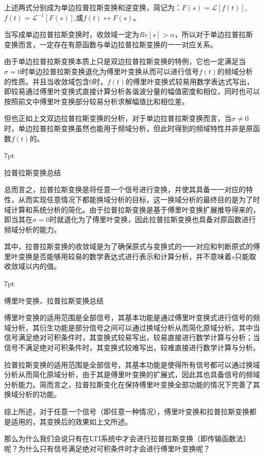\documentclass{article}
\numberwithin{equation}{section}
\numberwithin{figure}{section}
\newenvironment{formal}{%
\def\FrameCommand{%
\hspace{1pt}%
{\color{DarkBlue}\vrule width 2pt}%
{\color{formalshade}\vrule width 4pt}%
\colorbox{formalshade}%
}%
\MakeFramed{\advance\hsize-\width\FrameRestore}%
\noindent\hspace{-4.55pt}%
\begin{adjustwidth}{}{7pt}%
\vspace{2pt}\vspace{2pt}%
}
{%
\vspace{2pt}\end{adjustwidth}\endMakeFramed%
}
\begin{document}
上述两式分别成为单边拉普拉斯变换和逆变换，简记为：$F(s)=\mathscr{L}[f(t)]$,$f(t)=\mathscr{L}^{-1}[F(s)]$,或$f(t)\leftrightarrow F(s)$。

当写成单边拉普拉斯变换时，收敛域一定为$Re[s]>\alpha$，所以对于单边拉普拉斯变换而言，一定存在有原函数与单边拉普拉斯变换的一一对应关系。

由于单边拉普拉斯变换本质上只是双边拉普拉斯变换的特例，它也一定满足当$\sigma=0$时单边拉普拉斯变换退化为傅里叶变换从而可以进行信号$f(t)$的频域分析的性质。并且当收敛域包含0时，$f(t)$的傅里叶变换式较易用数学表达式写出，即较易通过傅里叶变换式直接计算分析各谐波分量的幅值密度和相位，同时也可以按照前文中傅里叶变换部分较易分析求解幅值比和相位差。

但也正如上文双边拉普拉斯变换的分析，对于单边拉普拉斯变换而言，当$\sigma \neq 0$时，单边拉普拉斯变换虽然也能用于频域分析，但此时得到的频域特性并非是原函数$f(t)$的。

\begin{formal}
    拉普拉斯变换总结
\end{formal}
    总而言之，拉普拉斯变换是将任意一个信号进行变换，并使其具备一一对应的特性，从而实现任意情况下都能换域分析的目标，这一换域分析的最终目的是为了时域计算和系统分析的简化。由于拉普拉斯变换是基于傅里叶变换扩展推导得来的，即当其在$\sigma = 0$时就退化为了傅里叶变换，因此拉普拉斯变换也具备对原函数进行频域分析的能力。

    其中，拉普拉斯变换的收敛域是为了确保原式与变换式的一一对应和判断原式的傅里叶变换是否能够用较易的数学表达式进行表示和计算分析，并不意味着$s$只能取收敛域以内的值。

\begin{formal}
    傅里叶变换、拉普拉斯变换总结
\end{formal}

    傅里叶变换的适用范围是全部信号，其基本功能是通过傅里叶变换式进行信号的频域分析，其衍生功能是部分信号之间可以通过换域分析从而简化原域分析。其中当信号满足绝对可积条件时，其变换式较易写出，较易直接进行数学计算与分析；当信号不满足绝对可积条件时，其变换式较难写出，较难直接进行数学计算与分析。

    拉普拉斯变换的适用范围是全部信号，其基本功能是使得所有信号都可以通过换域分析从而简化原域分析，由于其是傅里叶变换的扩展式，因此其也具备信号的频域分析能力。简而言之，拉普拉斯变化在保持傅里叶变换全部功能的情况下完善了其换域分析的功能。

    综上所述，对于任意一个信号（即任意一种情况），傅里叶变换和拉普拉斯变换都是适用的，其变换后的效果如上文所述。

    那么为什么我们会说只有在LTI系统中才会进行拉普拉斯变换（即传输函数法）呢？为什么只有信号满足绝对可积条件时才会进行傅里叶变换呢？
\end{document}
